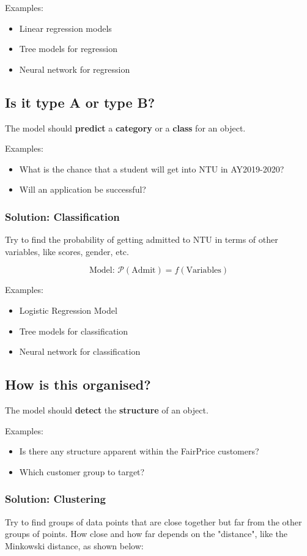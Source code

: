 \documentclass[11pt]{article}
\begin{document}
Examples:
\begin{itemize}
\item Linear regression models
\item Tree models for regression
\item Neural network for regression
\end{itemize}
\subsection{Is it type A or type B?}
\label{sec:orgc1e0e30}
The model should \textbf{predict} a \textbf{category} or a \textbf{class} for an object.

Examples:
\begin{itemize}
\item What is the chance that a student will get into NTU in AY2019-2020?
\item Will an application be successful?
\end{itemize}
\subsubsection{Solution: Classification}
\label{sec:orgbd3d102}
Try to find the probability of getting admitted to NTU in terms of other variables, like scores, gender, etc.

\[\text{Model: } \mathcal{P} (\text{Admit}) = f(\text{Variables})\]

Examples:
\begin{itemize}
\item Logistic Regression Model
\item Tree models for classification
\item Neural network for classification
\end{itemize}
\subsection{How is this organised?}
\label{sec:org690e6ac}
The model should \textbf{detect} the \textbf{structure} of an object.

Examples:
\begin{itemize}
\item Is there any structure apparent within the FairPrice customers?
\item Which customer group to target?
\end{itemize}
\subsubsection{Solution: Clustering}
\label{sec:org321effb}
Try to find groups of data points that are close together but far from the other groups of points. How close and how far depends on the "distance", like the Minkowski distance, as shown below:
\end{document}
